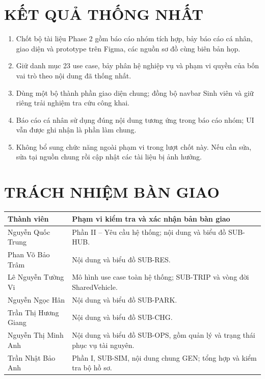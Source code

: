 \documentclass[10pt,a4paper]{article}
\begin{document}
\section{KẾT QUẢ THỐNG NHẤT}
\begin{enumerate}
  \item Chốt bộ tài liệu Phase 2 gồm báo cáo nhóm tích hợp, bảy báo cáo cá nhân, giao diện và prototype trên Figma, các nguồn sơ đồ cùng biên bản họp.
  \item Giữ danh mục 23 use case, bảy phân hệ nghiệp vụ và phạm vi quyền của bốn vai trò theo nội dung đã thống nhất.
  \item Dùng một bộ thành phần giao diện chung; đồng bộ navbar Sinh viên và giữ riêng trải nghiệm tra cứu công khai.
  \item Báo cáo cá nhân sử dụng đúng nội dung tương ứng trong báo cáo nhóm; UI vẫn được ghi nhận là phần làm chung.
  \item Không bổ sung chức năng ngoài phạm vi trong lượt chốt này. Nếu cần sửa, sửa tại nguồn chung rồi cập nhật các tài liệu bị ảnh hưởng.
\end{enumerate}

\section{TRÁCH NHIỆM BÀN GIAO}
\begin{center}
\begin{tabularx}{\textwidth}{|L{40mm}|Y|}
  \hline
  \textbf{Thành viên} & \textbf{Phạm vi kiểm tra và xác nhận bản bàn giao}\\\hline
  Nguyễn Quốc Trung & Phần II -- Yêu cầu hệ thống; nội dung và biểu đồ SUB-HUB.\\\hline
  Phan Võ Bảo Trâm & Nội dung và biểu đồ SUB-RES.\\\hline
  Lê Nguyễn Tường Vi & Mô hình use case toàn hệ thống; SUB-TRIP và vòng đời SharedVehicle.\\\hline
  Nguyễn Ngọc Hân & Nội dung và biểu đồ SUB-PARK.\\\hline
  Trần Thị Hương Giang & Nội dung và biểu đồ SUB-CHG.\\\hline
  Nguyễn Thị Minh Anh & Nội dung và biểu đồ SUB-OPS, gồm quản lý và trạng thái phục vụ tài nguyên.\\\hline
  Trần Nhật Bảo Anh & Phần I, SUB-SIM, nội dung chung GEN; tổng hợp và kiểm tra bộ hồ sơ.\\\hline
\end{tabularx}
\end{center}
\end{document}
